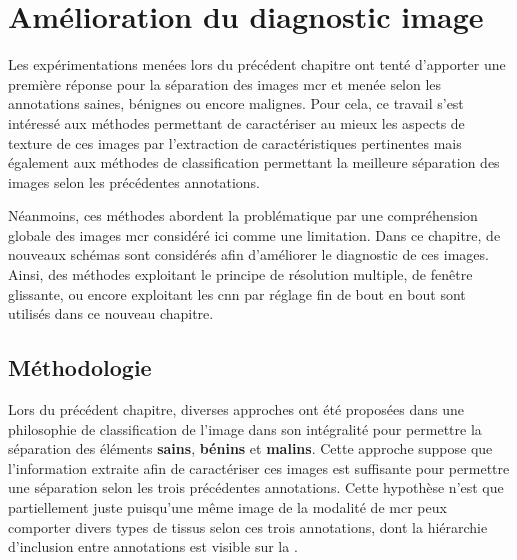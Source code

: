 \renewcommand{\thechapter}{\arabic{chapter}}
\setcounter{chapter}{5}

\chapter{Amélioration du diagnostic image}
\label{chap:chapter_6}
\chapterintro
Les expérimentations menées lors du précédent chapitre ont tenté d'apporter une première réponse pour la séparation des images \acrlong{mcr} et menée selon les annotations saines, bénignes ou encore malignes. Pour cela, ce travail s'est intéressé aux méthodes permettant de caractériser au mieux les aspects de texture de ces images par l'extraction de caractéristiques pertinentes mais également aux méthodes de classification permettant la meilleure séparation des images selon les précédentes annotations.\par

Néanmoins, ces méthodes abordent la problématique par une compréhension globale des images \acrlong{mcr} considéré ici comme une limitation. Dans ce chapitre, de nouveaux schémas sont considérés afin d'améliorer le diagnostic de ces images. Ainsi, des méthodes exploitant le principe de résolution multiple, de fenêtre glissante, ou encore exploitant les \acrlong{cnn} par réglage fin de bout en bout sont utilisés dans ce nouveau chapitre.\par

\newpage

\section{Méthodologie}
Lors du précédent chapitre, diverses approches ont été proposées dans une philosophie de classification de l'image dans son intégralité pour permettre la séparation des éléments \textbf{sains}, \textbf{bénins} et \textbf{malins}. Cette approche suppose que l'information extraite afin de caractériser ces images est suffisante pour permettre une séparation selon les trois précédentes annotations. Cette hypothèse n'est que partiellement juste puisqu'une même image de la modalité de \gls{mcr} peux comporter divers types de tissus selon ces trois annotations, dont la hiérarchie d'inclusion entre annotations est visible sur la .\par

